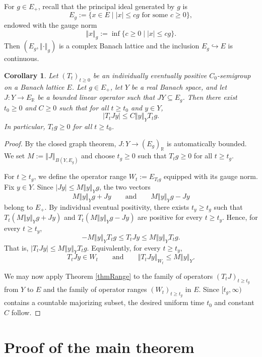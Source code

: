 \documentclass[12pt]{amsart}
\theoremstyle{plain}
\newtheorem{cor}[thm]{Corollary}
\theoremstyle{definition}
\newcommand{\R}{\mathbb{R}}
\newcommand{\norm}[1]{\left\Vert #1\right\Vert}
\begin{document}
	For $g\in E_+$, recall that the principal ideal generated by $g$ is
	\[
	E_g := \{x\in E \mid |x|\le c g \text{ for some } c\ge 0\},
	\]
	endowed with the gauge norm
	\[
	\norm{x}_g := \inf\{c\ge 0 \mid |x|\le c g\}.
	\]
	Then $(E_g,\norm{\cdot}_g)$ is a complex Banach lattice and the inclusion $E_g\hookrightarrow E$ is continuous.
	
	\begin{cor}\label{corDom}
		Let $(T_t)_{t\ge 0}$ be an individually eventually positive $C_0$-semigroup on a Banach lattice $E$. Let $g\in E_+$, let $Y$ be a real Banach space, and let $J\colon Y\longrightarrow E_{\R}$ be a bounded linear operator such that $JY\subseteq E_g$. Then there exist $t_0\ge 0$ and $C\ge 0$ such that for all $t \ge t_0$ and $y\in Y$,
		\begin{equation}
			\label{eqUdom}
			|T_t Jy| \le C\norm{y}_Y T_t g.
		\end{equation}
		In particular, $T_t g \ge 0$ for all $t\ge t_0$.
	\end{cor}
	
	\begin{proof}
		By the closed graph theorem, $J\colon Y \longrightarrow (E_g)_{\R}$ is automatically bounded. We set $M := \norm{J}_{B(Y, E_g)}$ and choose $t_g\ge 0$ such that $T_t g \ge 0$ for all $t\ge t_g$.
		
		For $t\ge t_g$, we define the operator range $W_t := E_{T_t g}$ equipped with its gauge norm. Fix $y\in Y$. Since $|Jy|\le M\norm{y}_Y g$, the two vectors
		\[
		M\norm{y}_Y g + Jy \qquad \text{and} \qquad M\norm{y}_Y g - Jy
		\]
		belong to $E_+$. By individual eventual positivity, there exists $t_y \ge t_g$ such that $T_t(M\norm{y}_Y g + Jy)$ and $T_t(M\norm{y}_Y g - Jy)$ are positive for every $t\ge t_y$. Hence, for every $t \ge t_y$,
		\[
		-M\norm{y}_Y T_t g \le T_t Jy \le M\norm{y}_Y T_t g.
		\]
		That is, $|T_t Jy| \le M\norm{y}_Y T_t g.$ Equivalently, for every $t \ge t_y$,
		\[
		T_t Jy \in W_t \qquad \text{and} \qquad \norm{T_t Jy}_{W_t} \le M\norm{y}_Y.
		\]
		
		We may now apply Theorem \ref{thmRange} to the family of operators $(T_t J)_{t\ge t_g}$ from $Y$ to $E$ and the family of operator ranges $(W_t)_{t\ge t_g}$ in $E$. Since $[t_g,\infty)$ contains a countable majorizing subset, the desired uniform time $t_0$ and constant $C$ follow.
	\end{proof}
	
	\section{Proof of the main theorem}
	
\end{document}
